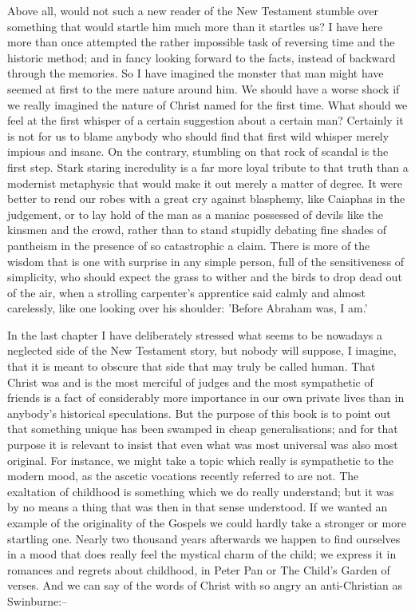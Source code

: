 Above all, would not such a new reader of the New Testament stumble over something that would startle him much more than it startles us? I have here more than once attempted the rather impossible task of reversing time and the historic method; and in fancy looking forward to the facts, instead of backward through the memories. So I have imagined the monster that man might have seemed at first to the mere nature around him. We should have a worse shock if we really imagined the nature of Christ named for the first time. What should we feel at the first whisper of a certain suggestion about a certain man? Certainly it is not for us to blame anybody who should find that first wild whisper merely impious and insane. On the contrary, stumbling on that rock of scandal is the first step. Stark staring incredulity is a far more loyal tribute to that truth than a modernist metaphysic that would make it out merely a matter of degree. It were better to rend our robes with a great cry against blasphemy, like Caiaphas in the judgement, or to lay hold of the man as a maniac possessed of devils like the kinsmen and the crowd, rather than to stand stupidly debating fine shades of pantheism in the presence of so catastrophic a claim. There is more of the wisdom that is one with surprise in any simple person, full of the sensitiveness of simplicity, who should expect the grass to wither and the birds to drop dead out of the air, when a strolling carpenter's apprentice said calmly and almost carelessly, like one looking over his shoulder: 'Before Abraham was, I am.'


In the last chapter I have deliberately stressed what seems to be nowadays a neglected side of the New Testament story, but nobody will suppose, I imagine, that it is meant to obscure that side that may truly be called human. That Christ was and is the most merciful of judges and the most sympathetic of friends is a fact of considerably more importance in our own private lives than in anybody's historical speculations. But the purpose of this book is to point out that something unique has been swamped in cheap generalisations; and for that purpose it is relevant to insist that even what was most universal was also most original. For instance, we might take a topic which really is sympathetic to the modern mood, as the ascetic vocations recently referred to are not. The exaltation of childhood is something which we do really understand; but it was by no means a thing that was then in that sense understood. If we wanted an example of the originality of the Gospels we could hardly take a stronger or more startling one. Nearly two thousand years afterwards we happen to find ourselves in a mood that does really feel the mystical charm of the child; we express it in romances and regrets about childhood, in Peter Pan or The Child's Garden of verses. And we can say of the words of Christ with so angry an anti-Christian as Swinburne:--

